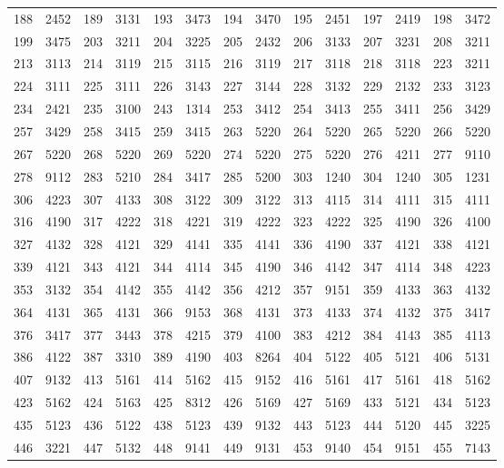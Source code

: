 \begin{threeparttable}
{\begin{tabular}{|cc|cc|cc|cc|cc|cc|cc|}
188 & 2452 & 189 & 3131 & 193 & 3473 & 194 & 3470 & 195 & 2451 & 197 & 2419 & 198 & 3472\\
199 & 3475 & 203 & 3211 & 204 & 3225 & 205 & 2432 & 206 & 3133 & 207 & 3231 & 208 & 3211\\
213 & 3113 & 214 & 3119 & 215 & 3115 & 216 & 3119 & 217 & 3118 & 218 & 3118 & 223 & 3211\\
224 & 3111 & 225 & 3111 & 226 & 3143 & 227 & 3144 & 228 & 3132 & 229 & 2132 & 233 & 3123\\
234 & 2421 & 235 & 3100 & 243 & 1314 & 253 & 3412 & 254 & 3413 & 255 & 3411 & 256 & 3429\\
257 & 3429 & 258 & 3415 & 259 & 3415 & 263 & 5220 & 264 & 5220 & 265 & 5220 & 266 & 5220\\
267 & 5220 & 268 & 5220 & 269 & 5220 & 274 & 5220 & 275 & 5220 & 276 & 4211 & 277 & 9110\\
278 & 9112 & 283 & 5210 & 284 & 3417 & 285 & 5200 & 303 & 1240 & 304 & 1240 & 305 & 1231\\
306 & 4223 & 307 & 4133 & 308 & 3122 & 309 & 3122 & 313 & 4115 & 314 & 4111 & 315 & 4111\\
316 & 4190 & 317 & 4222 & 318 & 4221 & 319 & 4222 & 323 & 4222 & 325 & 4190 & 326 & 4100\\
327 & 4132 & 328 & 4121 & 329 & 4141 & 335 & 4141 & 336 & 4190 & 337 & 4121 & 338 & 4121\\
339 & 4121 & 343 & 4121 & 344 & 4114 & 345 & 4190 & 346 & 4142 & 347 & 4114 & 348 & 4223\\
353 & 3132 & 354 & 4142 & 355 & 4142 & 356 & 4212 & 357 & 9151 & 359 & 4133 & 363 & 4132\\
364 & 4131 & 365 & 4131 & 366 & 9153 & 368 & 4131 & 373 & 4133 & 374 & 4132 & 375 & 3417\\
376 & 3417 & 377 & 3443 & 378 & 4215 & 379 & 4100 & 383 & 4212 & 384 & 4143 & 385 & 4113\\
386 & 4122 & 387 & 3310 & 389 & 4190 & 403 & 8264 & 404 & 5122 & 405 & 5121 & 406 & 5131\\
407 & 9132 & 413 & 5161 & 414 & 5162 & 415 & 9152 & 416 & 5161 & 417 & 5161 & 418 & 5162\\
423 & 5162 & 424 & 5163 & 425 & 8312 & 426 & 5169 & 427 & 5169 & 433 & 5121 & 434 & 5123\\
435 & 5123 & 436 & 5122 & 438 & 5123 & 439 & 9132 & 443 & 5123 & 444 & 5120 & 445 & 3225\\
446 & 3221 & 447 & 5132 & 448 & 9141 & 449 & 9131 & 453 & 9140 & 454 & 9151 & 455 & 7143\\

\end{tabular}}
\end{threeparttable}
